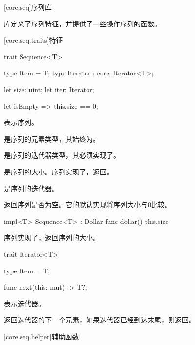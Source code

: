 
[core.seq]{序列库}

\pnum
{}库定义了序列特征，并提供了一些操作序列的函数。

[core.seq.traits]{特征}

\begin{itemdecl}
trait Sequence<T> {
    type Item = T;
    type Iterator : core::Iterator<T>;

    let size: uint;
    let iter: Iterator;

    let isEmpty => this.size == 0;
}
\end{itemdecl}

\pnum
{}表示序列。

\pnum
{}是序列的元素类型，其始终为。

\pnum
{}是序列的迭代器类型，其必须实现了。

\pnum
{}是序列的大小。序列实现了，返回。

\pnum
{}是序列的迭代器。

\pnum
{}返回序列是否为空。它的默认实现将序列大小与0比较。

\begin{itemdecl}
impl<T> Sequence<T> : Dollar {
    func dollar() { this.size }
}
\end{itemdecl}

\pnum
序列实现了，返回序列的大小。

\begin{itemdecl}
trait Iterator<T> {
    type Item = T;

    func next(this: mut) -> T?;
}
\end{itemdecl}

\pnum
{}表示迭代器。

\pnum
{}返回迭代器的下一个元素，如果迭代器已经到达末尾，则返回。

[core.seq.helper]{辅助函数}
